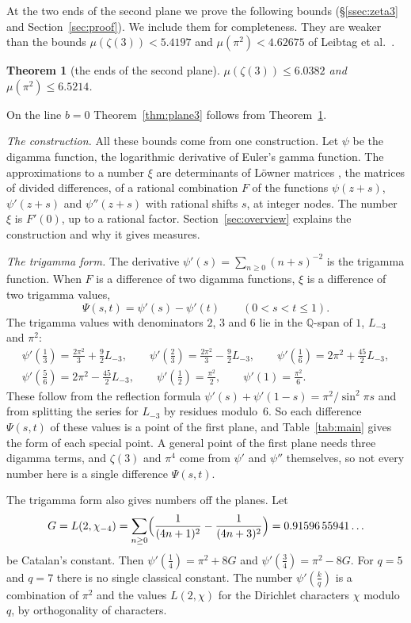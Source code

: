 \documentclass[11pt]{amsart}
\newtheorem{theorem}{Theorem}[section]
\theoremstyle{definition}
\theoremstyle{remark}
\numberwithin{equation}{section}
\newcommand{\Q}{\mathbb Q}
\newcommand{\Lt}{L_{-3}}             %
\newcommand{\MuHalvesU}{6.5214}
\newcommand{\MuZetaThree}{6.0382}
\begin{document}
At the two ends of the second plane we prove the following bounds
(\S\ref{ssec:zeta3} and Section~\ref{sec:proof}). We include them for completeness. They are weaker than the bounds
$\mu(\zeta(3))<5.4197$ and $\mu(\pi^2)<4.62675$ of Leibtag et al.\ \cite{LBKWSK26}.

\begin{theorem}[the ends of the second plane]\label{thm:ends}
$\mu(\zeta(3))\le\MuZetaThree$ and $\mu(\pi^2)\le\MuHalvesU$.
\end{theorem}

On the line $b=0$ Theorem~\ref{thm:plane3} follows from Theorem~\ref{thm:ends}.

\emph{The construction.} All these bounds come from one construction. Let $\psi$ be the digamma function, the
logarithmic derivative of Euler's gamma function. The approximations to a number $\xi$ are determinants of L\"owner
matrices \cite{Loewner34}, the matrices of divided differences, of a rational combination $F$ of the functions
$\psi(z+s)$, $\psi'(z+s)$ and $\psi''(z+s)$ with rational shifts $s$, at integer nodes. The number $\xi$ is $F'(0)$, up to a rational
factor. Section~\ref{sec:overview} explains the construction and why it gives measures.

\emph{The trigamma form.} The derivative $\psi'(s)=\sum_{n\ge0}(n+s)^{-2}$ is the trigamma function. When $F$ is a
difference of two digamma functions, $\xi$ is a difference of two trigamma values,
\[
 \Psi(s,t)=\psi'(s)-\psi'(t)\qquad(0<s<t\le1).
\]
The trigamma values with denominators $2$, $3$ and $6$ lie in the $\Q$-span of $1$, $\Lt$ and $\pi^2$:
\begin{gather*}
 \psi'(\tfrac13)=\tfrac{2\pi^2}3+\tfrac92\Lt,\qquad \psi'(\tfrac23)=\tfrac{2\pi^2}3-\tfrac92\Lt,\qquad
 \psi'(\tfrac16)=2\pi^2+\tfrac{45}2\Lt,\\
 \psi'(\tfrac56)=2\pi^2-\tfrac{45}2\Lt,\qquad \psi'(\tfrac12)=\tfrac{\pi^2}2,\qquad \psi'(1)=\tfrac{\pi^2}6 .
\end{gather*}
These follow from the reflection formula $\psi'(s)+\psi'(1-s)=\pi^2/\sin^2\pi s$ and from splitting the series for
$\Lt$ by residues modulo~$6$. So each difference $\Psi(s,t)$ of these values is a point of the first plane, and
Table~\ref{tab:main} gives the form of each special point. A general point of the first plane needs three digamma
terms, and $\zeta(3)$ and $\pi^4$ come from $\psi'$ and $\psi''$ themselves, so not every number here is a single
difference $\Psi(s,t)$.

The trigamma form also gives numbers off the planes. Let
\[
 G=L(2,\chi_{-4})=\sum_{n\ge0}\Bigl(\frac1{(4n+1)^2}-\frac1{(4n+3)^2}\Bigr)=0.91596\,55941\ldots
\]
be Catalan's constant. Then $\psi'(\frac14)=\pi^2+8G$ and $\psi'(\frac34)=\pi^2-8G$. For $q=5$ and $q=7$ there is no
single classical constant. The number $\psi'(\frac kq)$ is a combination of $\pi^2$ and the values $L(2,\chi)$ for the
Dirichlet characters $\chi$ modulo~$q$, by orthogonality of characters.
\end{document}

